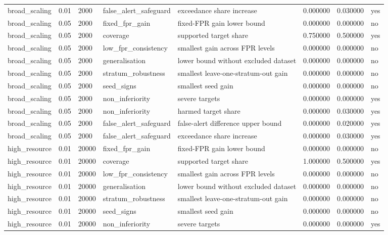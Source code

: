 \begin{tabular}{llllllll}
broad\_scaling & 0.01 & 2000 & false\_alert\_safeguard & exceedance share increase & 0.000000 & 0.030000 & yes \\
broad\_scaling & 0.05 & 2000 & fixed\_fpr\_gain & fixed-FPR gain lower bound & 0.000000 & 0.000000 & no \\
broad\_scaling & 0.05 & 2000 & coverage & supported target share & 0.750000 & 0.500000 & yes \\
broad\_scaling & 0.05 & 2000 & low\_fpr\_consistency & smallest gain across FPR levels & 0.000000 & 0.000000 & no \\
broad\_scaling & 0.05 & 2000 & generalisation & lower bound without excluded dataset & 0.000000 & 0.000000 & no \\
broad\_scaling & 0.05 & 2000 & stratum\_robustness & smallest leave-one-stratum-out gain & 0.000000 & 0.000000 & no \\
broad\_scaling & 0.05 & 2000 & seed\_signs & smallest seed gain & 0.000000 & 0.000000 & no \\
broad\_scaling & 0.05 & 2000 & non\_inferiority & severe targets & 0.000000 & 0.000000 & yes \\
broad\_scaling & 0.05 & 2000 & non\_inferiority & harmed target share & 0.000000 & 0.030000 & yes \\
broad\_scaling & 0.05 & 2000 & false\_alert\_safeguard & false-alert difference upper bound & 0.000000 & 0.020000 & yes \\
broad\_scaling & 0.05 & 2000 & false\_alert\_safeguard & exceedance share increase & 0.000000 & 0.030000 & yes \\
high\_resource & 0.01 & 20000 & fixed\_fpr\_gain & fixed-FPR gain lower bound & 0.000000 & 0.000000 & no \\
high\_resource & 0.01 & 20000 & coverage & supported target share & 1.000000 & 0.500000 & yes \\
high\_resource & 0.01 & 20000 & low\_fpr\_consistency & smallest gain across FPR levels & 0.000000 & 0.000000 & no \\
high\_resource & 0.01 & 20000 & generalisation & lower bound without excluded dataset & 0.000000 & 0.000000 & no \\
high\_resource & 0.01 & 20000 & stratum\_robustness & smallest leave-one-stratum-out gain & 0.000000 & 0.000000 & no \\
high\_resource & 0.01 & 20000 & seed\_signs & smallest seed gain & 0.000000 & 0.000000 & no \\
high\_resource & 0.01 & 20000 & non\_inferiority & severe targets & 0.000000 & 0.000000 & yes \\

\end{tabular}
